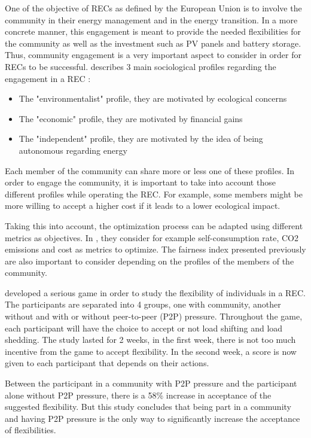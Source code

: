 \documentclass[12pt,a4paper]{article}
\begin{document}
One of the objective of RECs as defined by the European Union is to involve the community in their energy management and in the energy transition. In a more concrete manner, this engagement is meant to provide the needed flexibilities for the community as well as the investment such as PV panels and battery storage. Thus, community engagement is a very important aspect to consider in order for RECs to be successful. \cite{these_sorel} describes 3 main sociological profiles regarding the engagement in a REC :
\begin{itemize}
    \item {The "environmentalist" profile, they are motivated by ecological concerns}
    \item {The "economic" profile, they are motivated by financial gains}
    \item {The "independent" profile, they are motivated by the idea of being autonomous regarding energy}
\end{itemize}
Each member of the community can share more or less one of these profiles. In order to engage the community, it is important to take into account those different profiles while operating the REC. For example, some members might be more willing to accept a higher cost if it leads to a lower ecological impact.

Taking this into account, the optimization process can be adapted using different metrics as objectives. In \cite{these_sorel}, they consider for example self-consumption rate, CO2 emissions and cost as metrics to optimize. The fairness index presented previously are also important to consider depending on the profiles of the members of the community.

\cite{article_9} developed a serious game in order to study the flexibility of individuals in a REC. The participants are separated into 4 groups, one with community, another without and with or without peer-to-peer (P2P) pressure. Throughout the game, each participant will have the choice to accept or not load shifting and load shedding. The study lasted for 2 weeks, in the first week, there is not too much incentive from the game to accept flexibility. In the second week, a score is now given to each participant that depends on their actions.

Between the participant in a community with P2P pressure and the participant alone without P2P pressure, there is a 58\% increase in acceptance of the suggested flexibility. But this study concludes that being part in a community and having P2P pressure is the only way to significantly increase the acceptance of flexibilities.
\end{document}
